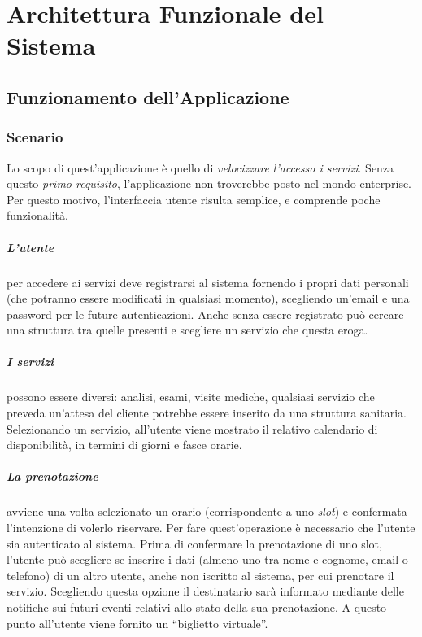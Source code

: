 \chapter{Architettura Funzionale del Sistema}
\label{chap:systemdesign}
\section{Funzionamento dell'Applicazione}
\subsection{Scenario}
Lo scopo di quest'applicazione è quello di \textit{velocizzare l'accesso i servizi}. Senza questo \textit{primo requisito}, l'applicazione non troverebbe posto nel mondo enterprise. Per questo motivo, l'interfaccia utente risulta semplice, e comprende poche funzionalità. 
\paragraph{L'utente} per accedere ai servizi deve registrarsi al sistema fornendo i propri dati personali (che potranno essere modificati in qualsiasi momento), scegliendo un'email e una password per le future autenticazioni. Anche senza essere registrato può cercare una struttura tra quelle presenti e scegliere un servizio che questa eroga. 
\paragraph{I servizi} possono essere diversi: analisi, esami, visite mediche, qualsiasi servizio che preveda un'attesa del cliente potrebbe essere inserito da una struttura sanitaria. Selezionando un servizio, all'utente viene mostrato il relativo calendario di disponibilità, in termini di giorni e fasce orarie. 
\paragraph{La prenotazione} avviene una volta selezionato un orario (corrispondente a uno \emph{slot}) e confermata l'intenzione di volerlo riservare. Per fare quest'operazione è necessario che l'utente sia autenticato al sistema. Prima di confermare la prenotazione di uno slot, l'utente può scegliere se inserire i dati (almeno uno tra nome e cognome, email o telefono) di un altro utente, anche non iscritto al sistema, per cui prenotare il servizio. Scegliendo questa opzione il destinatario sarà informato mediante delle notifiche sui futuri eventi relativi allo stato della sua prenotazione. A questo punto all'utente viene fornito un ``biglietto virtuale''.
